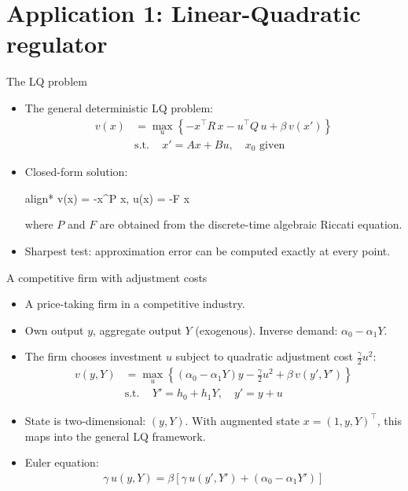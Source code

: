 \documentclass[aspectratio=169,10pt]{beamer}
\newcommand{\st}{\textrm{s.t.}\,}
\begin{document}
\section{\textcolor{KahouBlack}{Application 1: Linear-Quadratic regulator}}

\begin{frame}{The LQ problem}
	\begin{itemize}
		\item The general deterministic LQ problem:
		\begin{align*}
			v(x) &= \max_u \left\{ -x^\top R\, x - u^\top Q\, u + \beta\, v(x') \right\} \\
			&\st\quad x' = A x + B u, \quad x_0 \text{ given}
		\end{align*}
		\item Closed-form solution:
		\begin{empheq}[box=\tcbhighmath]{align*}
			v(x) = -x^\top P x, \qquad u(x) = -F x
		\end{empheq}
		where $P$ and $F$ are obtained from the discrete-time algebraic Riccati equation.
		\item Sharpest test: approximation error can be computed exactly at every point.
	\end{itemize}
\end{frame}

\begin{frame}{A competitive firm with adjustment costs}
	\begin{itemize}
		\item A price-taking firm in a competitive industry.
		\item Own output $y$, aggregate output $Y$ (exogenous). Inverse demand: $\alpha_0 - \alpha_1 Y$.
		\item The firm chooses investment $u$ subject to quadratic adjustment cost $\tfrac{\gamma}{2}u^2$:
		\begin{align*}
			v(y,Y) &= \max_u \left\{ (\alpha_0 - \alpha_1 Y)y - \tfrac{\gamma}{2}u^2 + \beta\, v(y',Y') \right\} \\
			&\st\quad Y' = h_0 + h_1 Y, \quad y' = y + u
		\end{align*}
		\item State is two-dimensional: $(y,Y)$. With augmented state $x = (1, y, Y)^\top$, this maps into the general LQ framework.
		\item Euler equation:
		\begin{align*}
			\gamma\, u(y,Y) = \beta\left[\gamma\, u(y',Y') + (\alpha_0 - \alpha_1 Y')\right]
		\end{align*}
	\end{itemize}
\end{frame}
\end{document}
